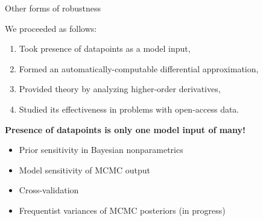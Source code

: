 
\begin{frame}[t]{Other forms of robustness}

We proceeded as follows:
\begin{enumerate}
    \item Took presence of datapoints as a model input,
    \item Formed an automatically-computable differential approximation,
    \item Provided theory by analyzing higher-order derivatives,
    \item Studied its effectiveness in problems with open-access data.
\end{enumerate}

\vspace{1em}
\textbf{Presence of datapoints is only one model input of many!}

\vspace{1em}
\begin{itemize}
    \item Prior sensitivity in Bayesian nonparametrics \citep{giordano2021bnp}
    \item Model sensitivity of MCMC output \citep{giordano2018covariances}
    \item Cross-validation \citep{giordano2019swiss}
    \item Frequentist variances of MCMC posteriors (in progress)
\end{itemize}

\end{frame}
